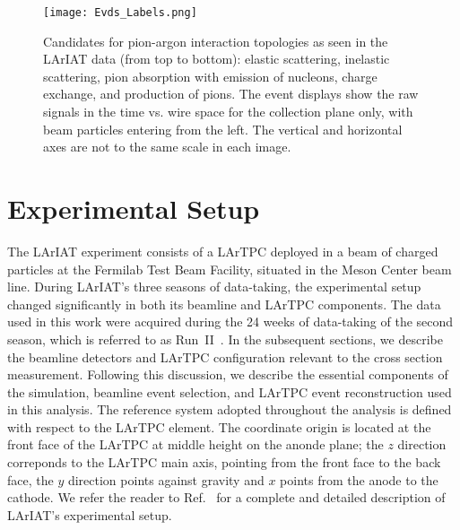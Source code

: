 \documentclass[%
 floatfix,
 reprint,
 twocolumn,
superscriptaddress,
showpacs,preprintnumbers,
 amsmath,amssymb,
 aps,
prd,
]{revtex4-1}
\begin{document}
\begin{figure}
  \centering  
\texttt{[image: Evds\_Labels.png]}
\caption{Candidates for pion-argon interaction topologies as seen in the LArIAT data (from top to bottom): elastic scattering, inelastic scattering, pion absorption with emission of nucleons, charge exchange, and production of pions. The event displays show the raw signals in the time vs. wire space for the collection plane only, with beam particles entering from the left. The vertical and horizontal axes are not to the same scale in each image.}
\label{fig:PionsEvd}
\end{figure}


\section{\label{sec:ExperimentalSetup}Experimental Setup}
The LArIAT experiment consists of a LArTPC deployed in a beam of charged particles at the Fermilab Test Beam Facility, situated in the  Meson Center beam line. During LArIAT's three seasons of data-taking, the experimental setup changed significantly in both its beamline and LArTPC components. The data used in this work were acquired during the 24 weeks of data-taking of the second season, which is referred to as Run~II~\cite{Acciarri_2020}. In the subsequent sections, we describe the beamline detectors and LArTPC configuration relevant to the cross section measurement. Following this discussion, we describe the essential components of the simulation, beamline event selection, and LArTPC event reconstruction used in this analysis.  The reference system adopted throughout the analysis is defined with respect to the LArTPC element. The coordinate origin is located at the front face of the LArTPC at middle height on the anonde plane; the $z$ direction correponds to the LArTPC main axis, pointing from the front face to the back face, the $y$ direction points against gravity and $x$ points from the anode to the cathode. 
We refer the reader to Ref.~\cite{Acciarri_2020} for a complete and detailed description of LArIAT's experimental setup.

\end{document}
